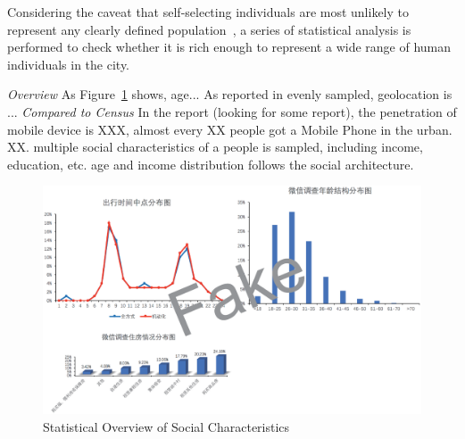 Considering the caveat that self-selecting individuals are most unlikely to represent any clearly defined population~\cite{Longley2015}, a series of statistical analysis is performed to check whether it is rich enough to represent a wide range of human individuals in the city.

\textit{Overview} As Figure~\ref{fig:data_stat} shows, age... As reported in evenly sampled, geolocation is ...
\textit{Compared to Census} In the report (looking for some report), the penetration of mobile device is XXX, almost every XX people got a Mobile Phone in the urban. XX.  multiple social characteristics of a people is sampled, including income, education, etc. age and income distribution follows the social architecture. 



\begin{figure}[htb!]
 \centering %
 \includegraphics[width=\columnwidth]{pictures/data_detail}
 \caption{Statistical Overview of Social Characteristics}
 \label{fig:data_stat}
\end{figure}


